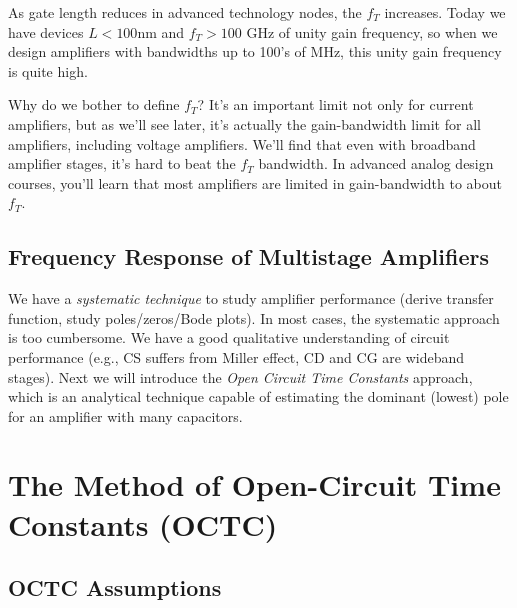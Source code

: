As gate length reduces in advanced technology nodes, the $f_T$ increases.  Today we have devices $L < 100$nm and $f_T > 100$ GHz of unity gain frequency, so when we design amplifiers with bandwidths up to 100's of MHz, this unity gain frequency is quite high.

Why do we bother to define $f_T$?  It's an important limit not only for current amplifiers, but as we'll see later, it's actually the gain-bandwidth limit for all amplifiers, including voltage amplifiers.  We'll find that even with broadband amplifier stages, it's hard to beat the $f_T$ bandwidth.  In advanced analog design courses, you'll learn that  most amplifiers are limited in gain-bandwidth to about $f_T$. 





\subsection{Frequency Response of Multistage Amplifiers}

We have a \textit{systematic technique} to study amplifier performance (derive transfer function, study poles/zeros/Bode plots).  In most cases, the systematic approach is too cumbersome. We have a good qualitative understanding of circuit performance (e.g., CS suffers from Miller effect, CD and CG are wideband stages).  Next we will introduce the \textit{Open Circuit Time Constants} approach, which is an analytical technique capable of estimating  the dominant (lowest) pole for an amplifier with many capacitors.


\section{The Method of Open-Circuit Time Constants (OCTC)}



\subsection{OCTC Assumptions}

